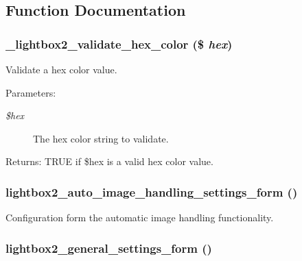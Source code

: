 \subsection{Function Documentation}
\hypertarget{lightbox2_8admin_8inc_22924efdd55f341a735a78f54483a8b2}{
\subsubsection[{\_\-lightbox2\_\-validate\_\-hex\_\-color}]{\setlength{\rightskip}{0pt plus 5cm}\_\-lightbox2\_\-validate\_\-hex\_\-color (\$ {\em hex})}}
\label{lightbox2_8admin_8inc_22924efdd55f341a735a78f54483a8b2}


Validate a hex color value.

\begin{Desc}
\item[Parameters:]
\begin{description}
\item[{\em \$hex}]The hex color string to validate. \end{description}
\end{Desc}
\begin{Desc}
\item[Returns:]TRUE if \$hex is a valid hex color value. \end{Desc}
\hypertarget{lightbox2_8admin_8inc_bec3ac922e7554bec015bbeb4d9349f1}{
\subsubsection[{lightbox2\_\-auto\_\-image\_\-handling\_\-settings\_\-form}]{\setlength{\rightskip}{0pt plus 5cm}lightbox2\_\-auto\_\-image\_\-handling\_\-settings\_\-form ()}}
\label{lightbox2_8admin_8inc_bec3ac922e7554bec015bbeb4d9349f1}


Configuration form the automatic image handling functionality. \hypertarget{lightbox2_8admin_8inc_576fc0399477384e717cdb02268e07d1}{
\subsubsection[{lightbox2\_\-general\_\-settings\_\-form}]{\setlength{\rightskip}{0pt plus 5cm}lightbox2\_\-general\_\-settings\_\-form ()}}
\label{lightbox2_8admin_8inc_576fc0399477384e717cdb02268e07d1}


